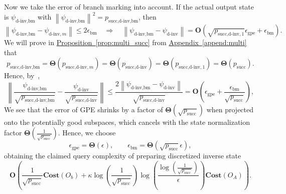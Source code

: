 \documentclass[letterpaper,onecolumn,11pt,accepted=2026-02-14]{quantumarticle}
\newcommand{\norm}[1]{\left\lVert#1\right\rVert}
\theoremstyle{remark}
\theoremstyle{plain}
\newcommand{\prop}[1]{\hyperref[prop:#1]{Proposition~\ref*{prop:#1}}}
\newcommand{\append}[1]{\hyperref[append:#1]{Appendix~\ref*{append:#1}}}
\begin{document}
Now we take the error of branch marking into account. If the actual output state is $\psi_{\text{d-inv,bm}}$ with $\norm{\psi_{\text{d-inv,bm}}}^2=p_{\text{succ,d-inv,bm}}$, then
\begin{equation}
    \norm{\psi_{\text{d-inv,bm}}
    -\psi_{\text{d-inv},m}}
    \leq2\epsilon_{\text{bm}}
    \quad\Rightarrow\quad
    \norm{\psi_{\text{d-inv,bm}}-\psi_{\text{d-inv}}}
    =\mathbf{O}\left(\sqrt{p_{\text{succ,d-inv},1}}\epsilon_{\text{gpe}}+\epsilon_{\text{bm}}\right).
\end{equation}
We will prove in \prop{multi_succ} from \append{multi} that
\begin{equation}
    p_{\text{succ,d-inv,bm}}=\mathbf{\Theta}\left(p_{\text{succ,d-inv},m}\right)=\mathbf{\Theta}\left(p_{\text{succ,d-inv}}\right)=\mathbf{\Theta}(p_{\text{succ,d-inv},1})=\mathbf{\Theta}\left(p_{\text{succ}}\right).
\end{equation}
Hence, by~\cite[Lemma 24]{QEVP},
\begin{equation}
    \norm{\frac{\psi_{\text{d-inv,bm}}}{\sqrt{p_{\text{succ,d-inv,bm}}}}
    -\frac{\psi_{\text{d-inv}}}{\sqrt{p_{\text{succ,d-inv}}}}}
    \leq\frac{2\norm{\psi_{\text{d-inv,bm}}-\psi_{\text{d-inv}}}}{\sqrt{p_{\text{succ,d-inv}}}}
    =\mathbf{O}\left(\epsilon_{\text{gpe}}+\frac{\epsilon_{\text{bm}}}{\sqrt{p_{\text{succ}}}}\right),
\end{equation}
We see that the error of GPE shrinks by a factor of $\mathbf{\Theta}\left(\sqrt{p_{\text{succ}}}\right)$ when projected onto the potentially good subspaces, which cancels with the state normalization factor $\mathbf{\Theta}\left(\frac{1}{\sqrt{p_{\text{succ}}}}\right)$. Hence, we choose 
\begin{equation}
    \epsilon_{\text{gpe}}=\mathbf{\Theta}(\epsilon),\qquad
    \epsilon_{\text{bm}}=\mathbf{\Theta}\left(\sqrt{p_{\text{succ}}}\epsilon\right),
\end{equation}
obtaining the claimed query complexity of preparing discretized inverse state
\begin{equation}
    \mathbf{O}\left(\frac{1}{\sqrt{p_{\text{succ}}}}\mathbf{Cost}\left(O_b\right)
    +\kappa
    \log\left(\frac{1}{\sqrt{p_{\text{succ}}}}\right)
    \log\left(\frac{\log\left(\frac{1}{\sqrt{p_{\text{succ}}}}\right)}{\epsilon}\right)
    \mathbf{Cost}\left(O_A\right)\right).
\end{equation}

\end{document}
